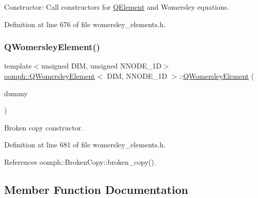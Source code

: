 Constructor\+: Call constructors for \hyperlink{classoomph_1_1QElement}{Q\+Element} and Womersley equations. 



Definition at line 676 of file womersley\+\_\+elements.\+h.

\mbox{\label{classoomph_1_1QWomersleyElement_a4dee9f42d861ede7e487652ed6cc0927}} 
\subsubsection{\texorpdfstring{Q\+Womersley\+Element()}{QWomersleyElement()}\hspace{0.1cm}{\footnotesize\ttfamily [2/2]}}
{\footnotesize\ttfamily template$<$unsigned D\+IM, unsigned N\+N\+O\+D\+E\+\_\+1D$>$ \\
\hyperlink{classoomph_1_1QWomersleyElement}{oomph\+::\+Q\+Womersley\+Element}$<$ D\+IM, N\+N\+O\+D\+E\+\_\+1D $>$\+::\hyperlink{classoomph_1_1QWomersleyElement}{Q\+Womersley\+Element} (\begin{DoxyParamCaption}\item[{const \hyperlink{classoomph_1_1QWomersleyElement}{Q\+Womersley\+Element}$<$ D\+IM, N\+N\+O\+D\+E\+\_\+1D $>$ \&}]{dummy }\end{DoxyParamCaption})\hspace{0.3cm}{\ttfamily [inline]}}



Broken copy constructor. 



Definition at line 681 of file womersley\+\_\+elements.\+h.



References oomph\+::\+Broken\+Copy\+::broken\+\_\+copy().



\subsection{Member Function Documentation}
\mbox{\label{classoomph_1_1QWomersleyElement_a5c4db93fb861995c7910ffe44751f449}} 
